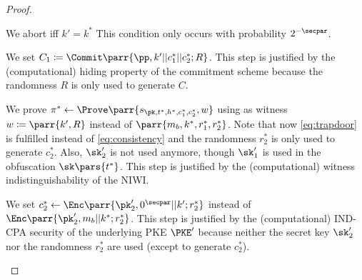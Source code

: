 \begin{proof}
\begin{hybrids}
        \item We abort iff \(k' = k^*\)
        This condition only occurs with probability \(2^{-\secpar}\).

        \item We set \(C_1 \coloneqq \Commit\parr{\pp,k'||c^*_1||c^*_2;R}\).
        This step is justified by the (computational) hiding property of the commitment scheme because the randomness \(R\) is only used to generate \(C\).

        \item We prove \(\pi^* \gets \Prove\parr{s_{\pk,t^*,h^*,c^*_1,c^*_2},w}\) using as witness \(w \coloneqq \parr{k',R}\) instead of \(\parr{m_b,k^*,r^*_1,r^*_2}\).
        Note that now \cref{eq:trapdoor} is fulfilled instead of \cref{eq:consistency} and the randomness \(r^*_2\) is only used to generate \(c^*_2\).
        Also, \(\sk'_2\) is not used anymore, though \(\sk'_1\) is used in the obfuscation \(\sk\pars{t^*}\).
        This step is justified by the (computational) witness indistinguishability of the NIWI.

        \item We set \(c^*_2 \gets \Enc\parr{\pk'_2,0^\secpar||k';r^*_2}\) instead of \(\Enc\parr{\pk'_2,m_b||k^*;r^*_2}\).
        This step is justified by the (computational) IND-CPA security of the underlying PKE \(\PKE'\) because neither the secret key \(\sk'_2\) nor the randomness \(r^*_2\) are used (except to generate \(c^*_2\)).


\end{hybrids}
\end{proof}
